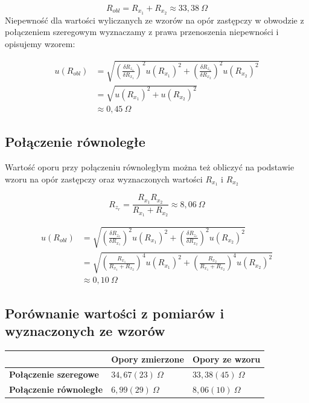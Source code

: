\documentclass[a4paper,11pt]{article}
\begin{document}
$$
R_{obl} = R_{x_1} + R_{x_2} \approx 33,38~\Omega
$$
Niepewność dla wartości wyliczanych ze wzorów na opór zastępczy w obwodzie z połączeniem szeregowym wyznaczamy z prawa przenoszenia niepewności i opisujemy wzorem:
\begin{center}
\begin{align*}
u(R_{obl}) &= \sqrt{\left( \frac{\delta R_{z_{s}} }{\delta R_{x_1}}  \right)^2 u(R_{x_1})^2  +\left( \frac{\delta R_{z_{s}} }{\delta R_{x_2}}  \right)^2  u(R_{x_2})^2  } \\
& = \sqrt{u(R_{x_1})^2 + u(R_{x_2})^2} \\
&\approx  0,45 ~\Omega
\end{align*}
\end{center}


\subsection{Połączenie równoległe}
Wartość oporu przy połączeniu równoległym można też obliczyć na podstawie wzoru na opór zastępczy oraz wyznaczonych wartości $R_{x_1}$ i  $R_{x_2}$

$$ 
R_{z_r} = \frac{ R_{x_1} R_{x_2}}{ R_{x_1} + R_{x_2}} \approx 8,06~\Omega
$$
\begin{center}
\begin{align*}
u(R_{obl}) &= \sqrt{\left( \frac{\delta R_{z_r} }{\delta R_{x_1}}  \right)^2 u(R_{x_1})^2  +\left( \frac{\delta R_{z_r} }{\delta R_{x_2}}  \right)^2  u(R_{x_2})^2  }\\ 
& =  \sqrt{\left(  \frac{R_{x_1}}{R_{x_1} + R_{x_2}}\right)^4  u(R_{x_1})^2 + \left(\frac{R_{x_2}}{R_{x_1} + R_{x_2}}\right)^4  u(R_{x_2})^2}\\ 
&\approx  0,10~\Omega
\end{align*}
\end{center}


\subsection{Porównanie wartości z pomiarów i wyznaczonych ze wzorów}
\begin{tabularx}{\textwidth}{XXX}
\hline
 & \textbf{Opory zmierzone}  & \textbf{Opory ze wzoru} \\ 
\hline \textbf{Połączenie szeregowe} & $34,67(23) ~\Omega$ & $33,38(45) ~\Omega$ \\ 
\hline \textbf{Połączenie równoległe} & $6,99(29)~\Omega$& $8,06(10) ~\Omega$\\ 
\hline 
\end{tabularx} 
\end{document}
